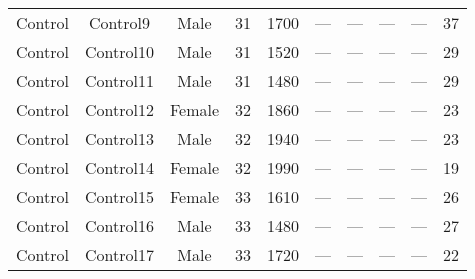 \begin{sidewaystable}[h]
\begin{tabular}{ccccccp{2cm}p{2cm}cc}
Control & Control9 & Male & 31 & 1700 & — & — & — & — & 37 \\
Control & Control10 & Male & 31 & 1520 & — & — & — & — & 29 \\
Control & Control11 & Male & 31 & 1480 & — & — & — & — & 29 \\
Control & Control12 & Female & 32 & 1860 & — & — & — & — & 23 \\
Control & Control13 & Male & 32 & 1940 & — & — & — & — & 23 \\
Control & Control14 & Female & 32 & 1990 & — & — & — & — & 19 \\
Control & Control15 & Female & 33 & 1610 & — & — & — & — & 26 \\
Control & Control16 & Male & 33 & 1480 & — & — & — & — & 27 \\
Control & Control17 & Male & 33 & 1720 & — & — & — & — & 22 \\

\hline %
\end{tabular}
\label{tab:2demograph}
\end{sidewaystable}
